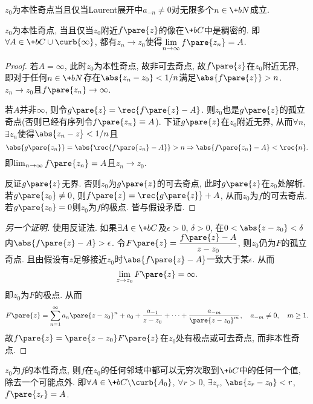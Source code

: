 \documentclass{ctexart}
\begin{document}
\begin{theorem}
    $z_0$为本性奇点当且仅当Laurent展开中$a_{-n}\neq 0$对无限多个$n\in \+bN$成立.
\end{theorem}
\begin{theorem}[Weierstra\ss]
    $z_0$为本性奇点, 当且仅当$z_0$附近$f\pare{z}$的像在$\+bC$中是稠密的. 即$\forall A \in \+bC\cup\curb{\infty}$, 都有$z_n\rightarrow z_0$使得$\displaystyle \lim_{n\rightarrow \infty} f\pare{z_n} = A$.
\end{theorem}
\begin{proof}
    若$A=\infty$, 此时$z_0$为本性奇点, 故非可去奇点, 故$f\pare{z}$在$z_0$附近无界, 即对于任何$n\in \+bN$存在$\abs{z_n - z_0}<1/n$满足$\abs{f\pare{z}} > {n}$. $z_n\rightarrow z_0$且$f\pare{z_n}\rightarrow \infty$.
    \par
    若$A$并非$\infty$, 则令$g\pare{z} = \displaystyle \rec{f\pare{z} - A}$. 则$z_0$也是$g\pare{z}$的孤立奇点(否则已经有序列令$f\pare{z_n}\equiv A$). 下证$g\pare{z}$在$z_0$附近无界, 从而$\forall n$, $\exists z_n$使得$\abs{z_n - z}<1/n$且
    \[ \abs{g\pare{z_n}} = \abs{\rec{f\pare{z_n} - A}} > n \Rightarrow \abs{f\pare{z_n} - A} < \rec{n}. \]
    即$\lim_{n\rightarrow \infty} f\pare{z_n} = A$且$z_n\rightarrow z_0$.
    \par
    反证$g\pare{z}$无界. 否则$z_0$为$g\pare{z}$的可去奇点, 此时$g\pare{z}$在$z_0$处解析. 若$g\pare{z_0}\neq 0$, 则$f\pare{z} = \displaystyle \rec{g\pare{z}} + A$, 从而$z_0$为$f$的可去奇点. 若$g\pare{z_0} = 0$则$z_0$为$f$的极点. 皆与假设矛盾.
\end{proof}
\begin{proof}[另一个证明]
    使用反证法. 如果$\exists A\in \+bC$及$\epsilon > 0$, $\delta > 0$, 在$0<\abs{z-z_0}<\delta$内$\abs{f\pare{z} - A} > \epsilon$. 令$F\pare{z} = \displaystyle \frac{f\pare{z} - A}{z-z_0}$, 则$z_0$仍为$F$的孤立奇点. 且由假设有$z$足够接近$z_0$时$\abs{f\pare{z} - A}$一致大于某$\epsilon$. 从而
    \[ \lim_{z\rightarrow z_0} F\pare{z} = \infty. \]
    即$z_0$为$F$的极点. 从而
    \[ F\pare{z} = \sum_{n=1}^\infty a_n\pare{z-z_0}^n + a_0 + \frac{a_{-1}}{z-z_0} + \cdots + \frac{a_{-m}}{\pare{z-z_0}^m},\quad a_{-m}\neq 0,\quad m\ge 1. \]
    故$f\pare{z} = \pare{z-z_0}F\pare{z}$在$z_0$处有极点或可去奇点, 而非本性奇点.
\end{proof}
\begin{theorem}[Picard大定理]
    $z_0$为$f$的本性奇点, 则$f$在$z_0$的任何邻域中都可以无穷次取到$\+bC$中的任何一个值, 除去一个可能点外. 即$\forall A \in \+bC\backslash\curb{A_0}$, $\forall r>0$, $\exists z_r$, $\abs{z_r - z_0}<r$, $f\pare{z_r} = A$.
\end{theorem}
\end{document}
